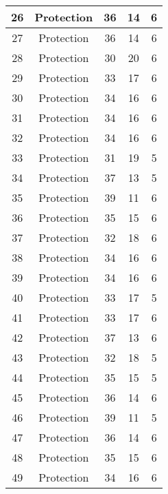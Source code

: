 \documentclass[results.tex]{subfiles}
\begin{document}
\begin{center}
\begin{tabular}{| c || c | c | c | c |}
    \hline
    26 & Protection & 36 & 14 & 6 \\ 
    \hline
    27 & Protection & 36 & 14 & 6 \\ 
    \hline
    28 & Protection & 30 & 20 & 6 \\ 
    \hline
    29 & Protection & 33 & 17 & 6 \\ 
    \hline
    30 & Protection & 34 & 16 & 6 \\ 
    \hline
    31 & Protection & 34 & 16 & 6 \\ 
    \hline
    32 & Protection & 34 & 16 & 6 \\ 
    \hline
    33 & Protection & 31 & 19 & 5 \\ 
    \hline
    34 & Protection & 37 & 13 & 5 \\ 
    \hline
    35 & Protection & 39 & 11 & 6 \\ 
    \hline
    36 & Protection & 35 & 15 & 6 \\ 
    \hline
    37 & Protection & 32 & 18 & 6 \\ 
    \hline
    38 & Protection & 34 & 16 & 6 \\ 
    \hline
    39 & Protection & 34 & 16 & 6 \\ 
    \hline
    40 & Protection & 33 & 17 & 5 \\ 
    \hline
    41 & Protection & 33 & 17 & 6 \\ 
    \hline
    42 & Protection & 37 & 13 & 6 \\ 
    \hline
    43 & Protection & 32 & 18 & 5 \\ 
    \hline
    44 & Protection & 35 & 15 & 5 \\ 
    \hline
    45 & Protection & 36 & 14 & 6 \\ 
    \hline
    46 & Protection & 39 & 11 & 5 \\ 
    \hline
    47 & Protection & 36 & 14 & 6 \\ 
    \hline
    48 & Protection & 35 & 15 & 6 \\ 
    \hline
    49 & Protection & 34 & 16 & 6 \\ 
    \hline   \end{tabular}
\end{center}
\end{document}
